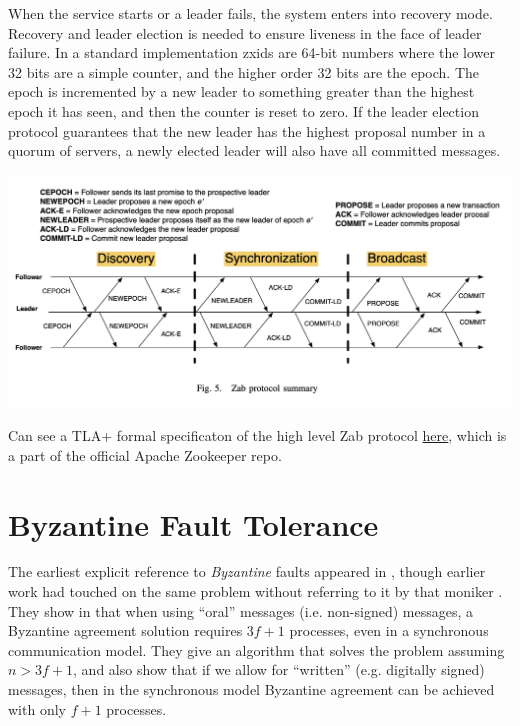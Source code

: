 \documentclass[10pt,a4paper]{article}
\begin{document}
When the service starts or a leader fails, the system enters into recovery mode. Recovery and leader election is needed to ensure liveness in the face of leader failure. In a standard implementation zxids are 64-bit numbers where the lower 32 bits are a simple counter, and the higher order 32 bits are the epoch. The epoch is incremented by a new leader to something greater than the highest epoch it has seen, and then the counter is reset to zero. If the leader election protocol guarantees that the new leader has the highest proposal number in a quorum of servers, a newly elected leader will also have all committed messages.
\begin{center}
    \includegraphics[scale=0.3]{diagrams/zab-protocol-overview.png}
\end{center}
Can see a TLA+ formal specificaton of the high level Zab protocol \href{https://github.com/apache/zookeeper/blob/248cc091d440659a819bdd44fe5b41a38321a929/zookeeper-specifications/protocol-spec/Zab.tla}{here}, which is a part of the official Apache Zookeeper repo.


\section{Byzantine Fault Tolerance}

The earliest explicit reference to \textit{Byzantine} faults appeared in \cite{1982lamportshostak}, though earlier work had touched on the same problem without referring to it by that moniker \cite{1980peasereaching,1978sift}. They show in \cite{1982lamportshostak} that when using ``oral'' messages (i.e. non-signed) messages, a Byzantine agreement solution requires $3f+1$ processes, even in a synchronous communication model. They give an algorithm that solves the problem assuming $n > 3f+1$, and also show that if we allow for ``written'' (e.g. digitally signed) messages, then in the synchronous model Byzantine agreement can be achieved with only $f+1$ processes.
\end{document}
